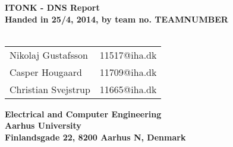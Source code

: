 
\begin{titlepage}
\begin{center}
{\LARGE \textbf{ITONK - DNS Report}}\\


\vspace{4cm}
\textbf{Handed in 25/4, 2014, by team no. TEAMNUMBER}\\~\\
\begin{tabular}{ll}
Nikolaj Gustafsson  & 11517@iha.dk \\
Casper Hougaard  & 11709@iha.dk \\
Christian Svejstrup  & 11665@iha.dk \\
\end{tabular}
\vfill
\textbf{Electrical and Computer Engineering}\\
\textbf{Aarhus University}\\
\textbf{Finlandsgade 22, 8200 Aarhus N, Denmark}
\end{center}
\end{titlepage}